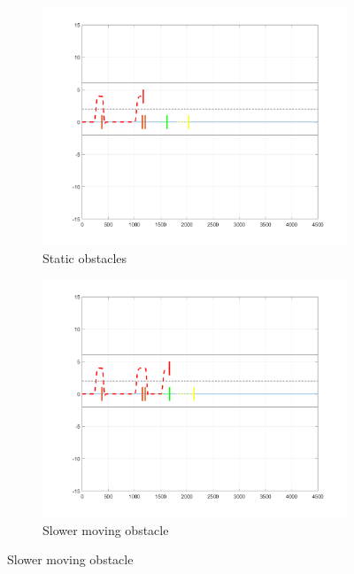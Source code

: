 \begin{figure}[H]
\centering

    \begin{subfigure}{.33\textwidth}
    \centering
   \includegraphics[width=1.1\textwidth,keepaspectratio]{Figures/overtake_multiple_left.png}
    \caption{Static obstacles}
    \label{subfig:multiple_left}
    \end{subfigure}%
    \begin{subfigure}{.33\textwidth}
    \centering
    \includegraphics[width=1.1\textwidth,keepaspectratio]{Figures/overtake_multiple_center.png}
    \caption{Slower moving obstacle}
    \label{subfig:multiple_center}

\end{subfigure}
\end{figure}
